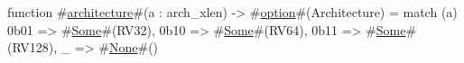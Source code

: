 function #\hyperref[sailRISCVzarchitecture]{architecture}#(a : arch_xlen) -> #\hyperref[sailRISCVzoption]{option}#(Architecture) =
  match (a) {
    0b01 => #\hyperref[sailRISCVzSome]{Some}#(RV32),
    0b10 => #\hyperref[sailRISCVzSome]{Some}#(RV64),
    0b11 => #\hyperref[sailRISCVzSome]{Some}#(RV128),
    _    => #\hyperref[sailRISCVzNone]{None}#()
  }
